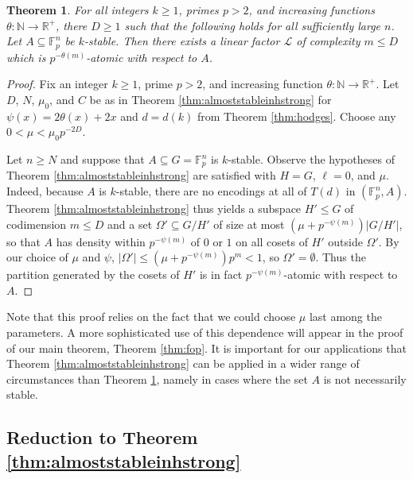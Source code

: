 \documentclass[12pt,oneside,british,a4wide]{amsart}
\newtheorem{theorem}{Theorem}[section]
\numberwithin{equation}{section}
\theoremstyle{definition}
\def\F{\mathbb{F}}
\newcommand{\calL}{\mathcal{L}}
\begin{document}
\begin{theorem}\label{thm:stablegpsstrong}
For all integers $k\geq 1$, primes $p>2$, and increasing functions $\theta:\mathbb{N}\rightarrow \mathbb{R}^+$, there  $D\geq 1$ such that the following holds for all sufficiently large $n$.  Let $A\subseteq \F_p^n$ be $k$-stable.  Then there exists a linear factor $\calL$ of complexity $m\leq D$ which is $p^{-\theta(m)}$-atomic with respect to $A$.
\end{theorem}
\begin{proof}
Fix an  integer  $k\geq 1$, prime  $p>2$, and increasing function $\theta:\mathbb{N}\rightarrow \mathbb{R}^+$.  Let $D$, $N$, $\mu_0$, and $C$ be as in Theorem \ref{thm:almoststableinhstrong} for $\psi(x)=2\theta(x)+2x$ and $d=d(k)$ from Theorem \ref{thm:hodges}.  Choose any $0<\mu<\mu_0p^{-2D}$.  

Let $n\geq N$ and suppose that $A\subseteq G=\F_p^n$ is $k$-stable. Observe the hypotheses of Theorem \ref{thm:almoststableinhstrong} are satisfied with  $H=G$, $\ell=0$, and $\mu$.  Indeed, because $A$ is $k$-stable, there are no encodings at all of $T(d)$ in $(\F_p^n,A)$.  Theorem \ref{thm:almoststableinhstrong} thus yields a subspace $H'\leqslant G$ of codimension $m\leq D$ and a set $\Omega'\subseteq G/H'$ of size at most $(\mu +p^{-\psi(m)})|G/H'|$, so that $A$ has density within $p^{-\psi(m)}$ of $0$ or $1$ on all cosets of $H'$ outside $\Omega'$.  By our choice of $\mu$ and $\psi$, $|\Omega'|\leq (\mu+p^{-\psi(m)})p^m<1$, so $\Omega'=\emptyset$.  Thus the partition generated by the cosets of $H'$ is in fact $p^{-\psi(m)}$-atomic with respect to $A$. 
\end{proof}

Note that this proof relies on the fact that we could choose $\mu$ last among the parameters.  A more sophisticated use of this dependence will appear in the proof of our main theorem, Theorem \ref{thm:fop}.  It is important for our applications that Theorem \ref{thm:almoststableinhstrong} can be applied  in a wider range of circumstances than Theorem \ref{thm:stablegpsstrong}, namely in cases where the set $A$ is not necessarily stable.

\subsection{Reduction to Theorem \ref{thm:almoststableinhstrong}}\label{subsec:foppfs} 
\end{document}
